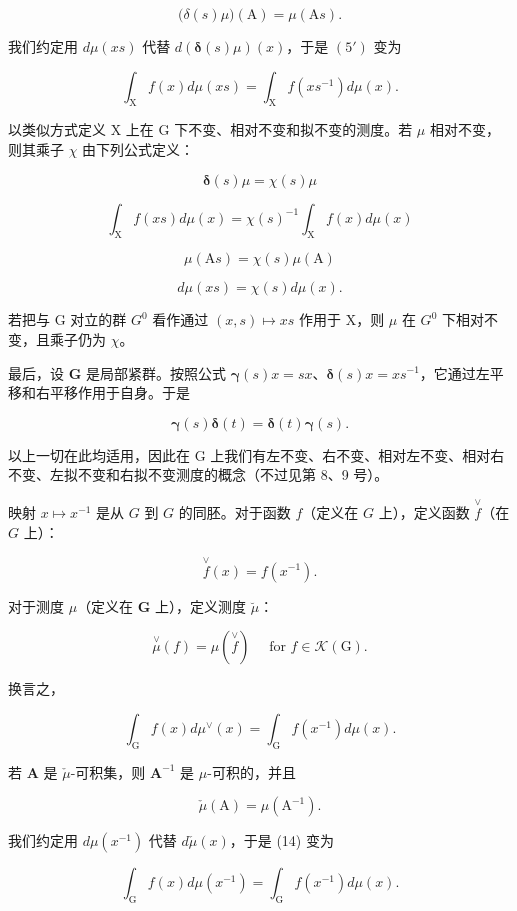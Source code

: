 \[
\big (\delta (s) \mu \big) (\mathrm{A}) = \mu (\mathrm{A} s).\tag{6'}
\]

我们约定用 \(d\mu(xs)\) 代替 \(d(\pmb{\delta}(s)\mu)(x)\)，于是 \((5')\) 变为

\[
\int_ {\mathrm{X}} f (x) d \mu (x s) = \int_ {\mathrm{X}} f (x s ^ {- 1}) d \mu (x).
\]

以类似方式定义 X 上在 G 下不变、相对不变和拟不变的测度。若 \(\mu\) 相对不变，则其乘子 \(\chi\) 由下列公式定义：



\[
\boldsymbol {\delta} (s) \mu = \chi (s) \mu\tag{7'}
\]

\[
\int_ {\mathrm{X}} f (x s) d \mu (x) = \chi (s) ^ {- 1} \int_ {\mathrm{X}} f (x) d \mu (x)\tag{8'}
\]

\[
\mu (\mathrm{A} s) = \chi (s) \mu (\mathrm{A})\tag{9'}
\]

\[
d \mu (x s) = \chi (s) d \mu (x).\tag{10'}
\]

若把与 G 对立的群 \(G^{0}\) 看作通过 \((x, s) \mapsto xs\) 作用于 X，则 \(\mu\) 在 \(G^{0}\) 下相对不变，且乘子仍为 \(\chi\)。

最后，设 \(\mathbf{G}\) 是局部紧群。按照公式 \(\pmb{\gamma}(s)x = sx\)、\(\pmb{\delta}(s)x = xs^{-1}\)，它通过左平移和右平移作用于自身。于是

\[
\boldsymbol {\gamma} (s) \boldsymbol {\delta} (t) = \boldsymbol {\delta} (t) \boldsymbol {\gamma} (s).\tag{11}
\]

以上一切在此均适用，因此在 G 上我们有左不变、右不变、相对左不变、相对右不变、左拟不变和右拟不变测度的概念（不过见第 8、9 号）。

映射 \(x \mapsto x^{-1}\) 是从 \(G\) 到 \(G\) 的同胚。对于函数 \(f\)（定义在 \(G\) 上），定义函数 \(\overset{\vee}{f}\)（在 \(G\) 上）：

\[
\stackrel {\vee} {f} (x) = f (x ^ {- 1}).\tag{12}
\]

对于测度 \(\mu\)（定义在 \(\mathbf{G}\) 上），定义测度 \(\breve{\mu}\)：

\[
\stackrel {\vee} {\mu} (f) = \mu (\stackrel {\vee} {f}) \quad \text { for } f \in \mathcal {K} (\mathrm{G}).\tag{13}
\]

换言之，

\[
\int_ {\mathrm{G}} f (x) d \mu^ {\vee} (x) = \int_ {\mathrm{G}} f (x ^ {- 1}) d \mu (x).\tag{14}
\]

若 \(\mathbf{A}\) 是 \(\check{\mu}\)-可积集，则 \(\mathbf{A}^{-1}\) 是 \(\mu\)-可积的，并且

\[
\check {\mu} (\mathrm{A}) = \mu (\mathrm{A} ^ {- 1}).\tag{15}
\]

我们约定用 \(d\mu(x^{-1})\) 代替 \(d\check{\mu}(x)\)，于是 (14) 变为

\[
\int_ {\mathrm{G}} f (x) d \mu (x ^ {- 1}) = \int_ {\mathrm{G}} f (x ^ {- 1}) d \mu (x).
\]

